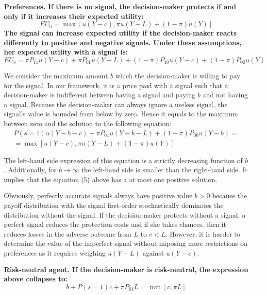 \documentclass[12pt,a4paper]{article}
\begin{document}
\vspace{10pt}
\bf Preferences. \rm If there is no signal, the decision-maker protects if and only if it increases their expected utility:
\begin{equation}
EU_0=\max[u(Y-c),\pi u(Y-L)+(1-\pi) u(Y)]
\end{equation}
The signal can increase expected utility if the decision-maker reacts differently to positive and negative signals. Under these assumptions, her expected utility with a signal is:
\begin{equation}
EU_s=\pi P_{11}u(Y-c)+\pi P_{01}u(Y-L)+(1-\pi)P_{10}u(Y-c)+(1-\pi)P_{00}u(Y)
\end{equation}

We consider the maximum amount $b$ which the decision-maker is willing to pay for the signal. In our framework, it is a price paid with a signal such that a decision-maker is indifferent between having a signal and paying $b$ and not having a signal. Because the decision-maker can always ignore a useless signal, the signal's value is bounded from below by zero. Hence it equals to the maximum between zero and the solution to the following equation:
\begin{equation}
\begin{split}
P(s=1)u(Y-b-c)+\pi P_{01}u(Y-b-L)+(1-\pi)P_{00}u(Y-b)=\\=\max[u(Y-c),\pi u(Y-L)+(1-\pi) u(Y)] 
\end{split}
\end{equation}

The left-hand side expression of this equation is a strictly decreasing function of $b$. Additionally, for $b\rightarrow \infty$ the left-hand side is smaller than the right-hand side. It implies that the equation (5) above has a at most one positive solution.

Obviously, perfectly accurate signals always have positive value $b>0$ because the payoff distribution with the signal first-order stochastically dominates the distribution without the signal. If the decision-maker protects without a signal, a perfect signal reduces the protection costs and if she takes chances, then it reduces losses in the adverse outcome from $L$ to $c<L$.  However, it is harder to determine the value of the imperfect signal without imposing more restrictions on preferences as it requires weighing $u(Y-L)$ against $u(Y-c)$.


\vspace{10pt}
\bf Risk-neutral agent. \rm If the decision-maker is risk-neutral, the expression above collapses to:
$$b+P(s=1)c+\pi P_{01}L=\min[c,\pi L]$$
\end{document}
